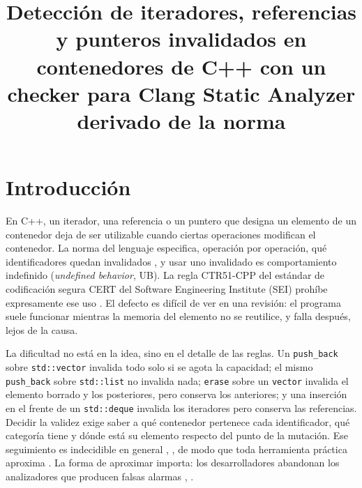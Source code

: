 \documentclass[conference]{IEEEtran}
\newcommand{\code}[1]{\texttt{#1}}
\begin{document}
\title{Detección de iteradores, referencias y punteros invalidados en contenedores de C++ con un checker para Clang Static Analyzer derivado de la norma}

\author{
\and
{}
}

\maketitle

\section{Introducción}

En C++, un iterador, una referencia o un puntero que designa un elemento de un contenedor deja de ser utilizable cuando ciertas operaciones modifican el contenedor. La norma del lenguaje especifica, operación por operación, qué identificadores quedan invalidados \cite{iso17}, y usar uno invalidado es comportamiento indefinido (\textit{undefined behavior}, UB). La regla CTR51-CPP del estándar de codificación segura CERT del Software Engineering Institute (SEI) prohíbe expresamente ese uso \cite{cert}. El defecto es difícil de ver en una revisión: el programa suele funcionar mientras la memoria del elemento no se reutilice, y falla después, lejos de la causa.

La dificultad no está en la idea, sino en el detalle de las reglas. Un \code{push\_back} sobre \code{std::vector} invalida todo solo si se agota la capacidad; el mismo \code{push\_back} sobre \code{std::list} no invalida nada; \code{erase} sobre un \code{vector} invalida el elemento borrado y los posteriores, pero conserva los anteriores; y una inserción en el frente de un \code{std::deque} invalida los iteradores pero conserva las referencias. Decidir la validez exige saber a qué contenedor pertenece cada identificador, qué categoría tiene y dónde está su elemento respecto del punto de la mutación. Ese seguimiento es indecidible en general \cite{landi92}, \cite{ramalingam94}, de modo que toda herramienta práctica aproxima \cite{livshits15}. La forma de aproximar importa: los desarrolladores abandonan los analizadores que producen falsas alarmas \cite{christakis16}, \cite{guo23}.
\end{document}
